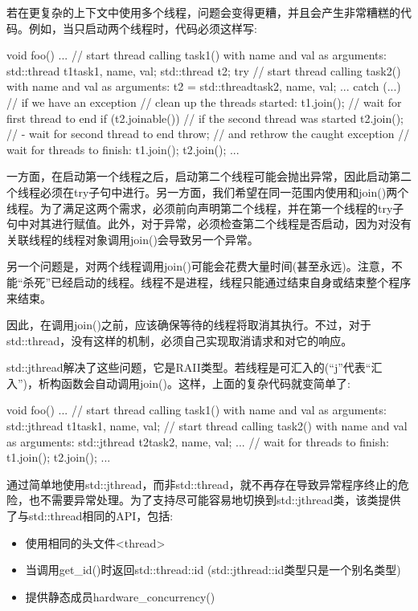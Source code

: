 若在更复杂的上下文中使用多个线程，问题会变得更糟，并且会产生非常糟糕的代码。例如，当只启动两个线程时，代码必须这样写:

\begin{cpp}
void foo()
{
	...
	// start thread calling task1() with name and val as arguments:
	std::thread t1{task1, name, val};
	std::thread t2;
	try {
		// start thread calling task2() with name and val as arguments:
		t2 = std::thread{task2, name, val};
		...
	}
	catch (...) { // if we have an exception
		// clean up the threads started:
		t1.join(); // wait for first thread to end
		if (t2.joinable()) { // if the second thread was started
			t2.join(); // - wait for second thread to end
		}
		throw; // and rethrow the caught exception
	}
	// wait for threads to finish:
	t1.join();
	t2.join();
	...
}
\end{cpp}

一方面，在启动第一个线程之后，启动第二个线程可能会抛出异常，因此启动第二个线程必须在try子句中进行。另一方面，我们希望在同一范围内使用和join()两个线程。为了满足这两个需求，必须前向声明第二个线程，并在第一个线程的try子句中对其进行赋值。此外，对于异常，必须检查第二个线程是否启动，因为对没有关联线程的线程对象调用join()会导致另一个异常。

另一个问题是，对两个线程调用join()可能会花费大量时间(甚至永远)。注意，不能“杀死”已经启动的线程。线程不是进程，线程只能通过结束自身或结束整个程序来结束。

因此，在调用join()之前，应该确保等待的线程将取消其执行。不过，对于std::thread，没有这样的机制，必须自己实现取消请求和对它的响应。


std::jthread解决了这些问题，它是RAII类型。若线程是可汇入的(“j”代表“汇入”)，析构函数会自动调用join()。这样，上面的复杂代码就变简单了:

\begin{cpp}
void foo()
{
	...
	// start thread calling task1() with name and val as arguments:
	std::jthread t1{task1, name, val};
	// start thread calling task2() with name and val as arguments:
	std::jthread t2{task2, name, val};
	...
	// wait for threads to finish:
	t1.join();
	t2.join();
	...
}
\end{cpp}

通过简单地使用std::jthread，而非std::thread，就不再存在导致异常程序终止的危险，也不需要异常处理。为了支持尽可能容易地切换到std::jthread类，该类提供了与std::thread相同的API，包括:

\begin{itemize}
\item 
使用相同的头文件<thread>

\item 
当调用get\_id()时返回std::thread::id (std::jthread::id类型只是一个别名类型)

\item 
提供静态成员hardware\_concurrency()
\end{itemize}

